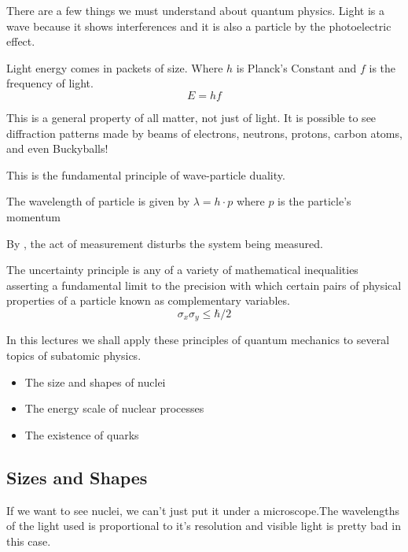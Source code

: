 \documentclass[english, 11pt]{article}
\begin{document}
There are a few things we must understand about quantum physics. Light is a wave because it shows interferences and it is also a particle by the photoelectric effect.

\begin{defn}\label{pe}
Light energy comes in packets of size. Where $h$ is Planck's Constant and $f$ is the frequency of light.
\[ E =hf \]
\end{defn}

This is a general property of all matter, not just of light. It is possible to see diffraction patterns made by beams of electrons, neutrons, protons, carbon atoms, and even Buckyballs!

This is the fundamental principle of wave-particle duality.

\begin{defn}
  The wavelength of particle is given by $\lambda = h\cdot p$ where $p$ is the particle's momentum
\end{defn}

By , the act of measurement disturbs the system being measured.

\begin{defn}\label{hup}
The uncertainty principle is any of a variety of mathematical inequalities asserting a fundamental limit to the precision with which certain pairs of physical properties of a particle known as complementary variables.
\[ \sigma_x \sigma_y \leq \hbar/2 \]
\end{defn}

In this lectures we shall apply these principles of quantum mechanics to several topics of subatomic physics.

\begin{itemize}
  \item The size and shapes of nuclei
  \item The energy scale of nuclear processes
  \item The existence of quarks
\end{itemize}

\subsection{Sizes and Shapes}

If we want to see nuclei, we can't just put it under a microscope.The wavelengths of the light used is proportional to it's resolution and visible light is pretty bad in this case.
\end{document}
